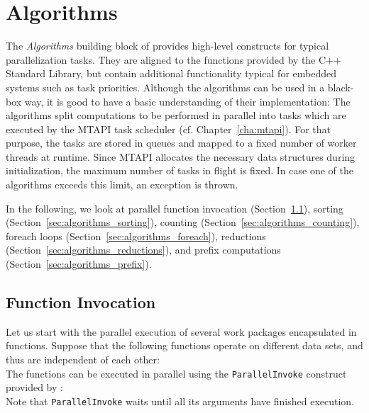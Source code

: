 \chapter{Algorithms}
\label{cha:algorithms}

The \emph{Algorithms} building block of \embb provides high-level constructs for typical parallelization tasks. They are aligned to the functions provided by the C++ Standard Library, but contain additional functionality typical for embedded systems such as task priorities. Although the algorithms can be used in a black-box way, it is good to have a basic understanding of their implementation: The algorithms split computations to be performed in parallel into tasks which are executed by the MTAPI task scheduler (cf. Chapter~\ref{cha:mtapi}). For that purpose, the tasks are stored in queues and mapped to a fixed number of worker threads at runtime. Since MTAPI allocates the necessary data structures during initialization, the maximum number of tasks in flight is fixed. In case one of the algorithms exceeds this limit, an exception is thrown. 

In the following, we look at parallel function invocation (Section~\ref{sec:algorithms_invoke}), sorting (Section~\ref{sec:algorithms_sorting}), counting (Section~\ref{sec:algorithms_counting}), foreach loops (Section~\ref{sec:algorithms_foreach}), reductions (Section~\ref{sec:algorithms_reductions}), and prefix computations (Section~\ref{sec:algorithms_prefix}).

\section{Function Invocation}
\label{sec:algorithms_invoke}

Let us start with the parallel execution of several work packages encapsulated in functions. Suppose that the following functions operate on different data sets, and thus are independent of each other:
%
\\
%
The functions can be executed in parallel using the \lstinline|ParallelInvoke| construct provided by {\embb}:
%
\\
%
Note that \lstinline|ParallelInvoke| waits until all its arguments have finished execution.

